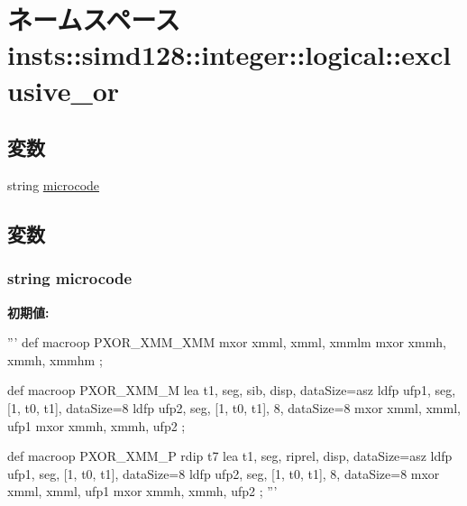 \hypertarget{namespaceinsts_1_1simd128_1_1integer_1_1logical_1_1exclusive__or}{
\section{ネームスペース insts::simd128::integer::logical::exclusive\_\-or}
\label{namespaceinsts_1_1simd128_1_1integer_1_1logical_1_1exclusive__or}
}
\subsection*{変数}
\begin{DoxyCompactItemize}
\item 
string \hyperlink{namespaceinsts_1_1simd128_1_1integer_1_1logical_1_1exclusive__or_a770f11a173e99389a8802f0107ed8f52}{microcode}
\end{DoxyCompactItemize}


\subsection{変数}
\hypertarget{namespaceinsts_1_1simd128_1_1integer_1_1logical_1_1exclusive__or_a770f11a173e99389a8802f0107ed8f52}{
\subsubsection[{microcode}]{\setlength{\rightskip}{0pt plus 5cm}string {\bf microcode}}}
\label{namespaceinsts_1_1simd128_1_1integer_1_1logical_1_1exclusive__or_a770f11a173e99389a8802f0107ed8f52}
{\bfseries 初期値:}
\begin{DoxyCode}
'''
def macroop PXOR_XMM_XMM {
    mxor xmml, xmml, xmmlm
    mxor xmmh, xmmh, xmmhm
};

def macroop PXOR_XMM_M {
    lea t1, seg, sib, disp, dataSize=asz
    ldfp ufp1, seg, [1, t0, t1], dataSize=8
    ldfp ufp2, seg, [1, t0, t1], 8, dataSize=8
    mxor xmml, xmml, ufp1
    mxor xmmh, xmmh, ufp2
};

def macroop PXOR_XMM_P {
    rdip t7
    lea t1, seg, riprel, disp, dataSize=asz
    ldfp ufp1, seg, [1, t0, t1], dataSize=8
    ldfp ufp2, seg, [1, t0, t1], 8, dataSize=8
    mxor xmml, xmml, ufp1
    mxor xmmh, xmmh, ufp2
};
'''
\end{DoxyCode}
